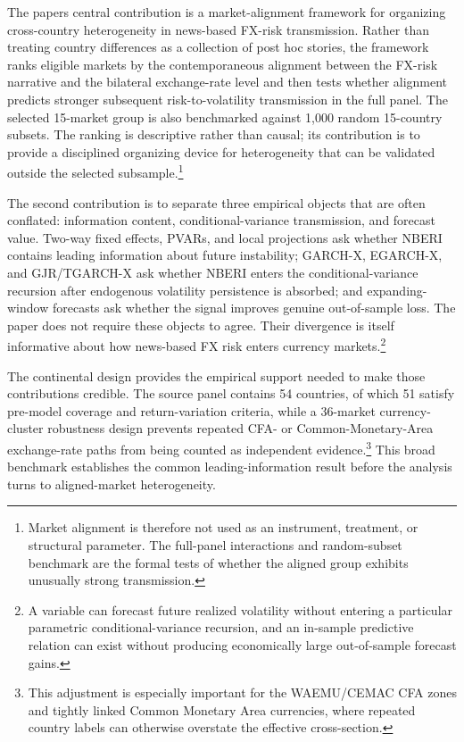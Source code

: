 \documentclass[11pt]{article}
\begin{document}
The paper\textquotesingle s central contribution is a market-alignment
framework for organizing cross-country heterogeneity in news-based
FX-risk transmission. Rather than treating country differences as a
collection of post hoc stories, the framework ranks eligible markets by
the contemporaneous alignment between the FX-risk narrative and the
bilateral exchange-rate level and then tests whether alignment predicts
stronger subsequent risk-to-volatility transmission in the full panel.
The selected 15-market group is also benchmarked against 1,000 random
15-country subsets. The ranking is descriptive rather than causal; its
contribution is to provide a disciplined organizing device for
heterogeneity that can be validated outside the selected subsample.\footnote{Market alignment is therefore not used as an instrument, treatment, or structural parameter. The full-panel interactions and random-subset benchmark are the formal tests of whether the aligned group exhibits unusually strong transmission.}

The second contribution is to separate three empirical objects that are
often conflated: information content, conditional-variance transmission,
and forecast value. Two-way fixed effects, PVARs, and local projections
ask whether NBERI contains leading information about future instability;
GARCH-X, EGARCH-X, and GJR/TGARCH-X ask whether NBERI enters the
conditional-variance recursion after endogenous volatility persistence
is absorbed; and expanding-window forecasts ask whether the signal
improves genuine out-of-sample loss. The paper does not require these
objects to agree. Their divergence is itself informative about how
news-based FX risk enters currency markets.\footnote{A variable can forecast future realized volatility without entering a particular parametric conditional-variance recursion, and an in-sample predictive relation can exist without producing economically large out-of-sample forecast gains.}

The continental design provides the empirical support needed to make
those contributions credible. The source panel contains 54 countries, of
which 51 satisfy pre-model coverage and return-variation criteria, while
a 36-market currency-cluster robustness design prevents repeated CFA- or
Common-Monetary-Area exchange-rate paths from being counted as
independent evidence.\footnote{This adjustment is especially important for the WAEMU/CEMAC CFA zones and tightly linked Common Monetary Area currencies, where repeated country labels can otherwise overstate the effective cross-section.} This broad benchmark establishes the common
leading-information result before the analysis turns to aligned-market
heterogeneity.
\end{document}
